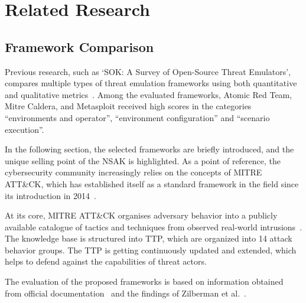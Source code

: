 
\chapter{Related Research}\label{ch:related-research}

\section{Framework Comparison}\label{sec:framework-comparison}
Previous research, such as \enquote*{SOK: A Survey of Open-Source Threat Emulators},
compares multiple types of threat emulation frameworks using both quantitative and qualitative metrics~\cite{Zilberman2020SoKThreatEmulators}.
Among the evaluated frameworks, Atomic Red Team, Mitre Caldera,
and Metasploit received high scores in the categories \enquote{environments and operator}, \enquote{environment configuration} and \enquote{scenario execution}.

In the following section, the selected frameworks are briefly introduced, and the unique selling point of the \gls{NSAK} is highlighted.
As a point of reference, the cybersecurity community increasingly relies on the concepts of MITRE ATT\&CK,
which has established itself as a standard framework in the field since its introduction in 2014~\cite{mitreattack, alsada2023attack}.

At its core, MITRE ATT\&CK organises adversary behavior into a publicly available catalogue of tactics and techniques from observed real-world intrusions~\cite{mitreattack}.
The knowledge base is structured into \gls{TTP}, which are organized into 14 attack behavior groups.
The \gls{TTP} is getting continuously updated and extended, which helps to defend against the capabilities of threat actors.

The evaluation of the proposed frameworks is based on information obtained from official documentation~\cite{caldera,atomicredteam,metasploitdocs} and the findings of Zilberman et al.~\cite{Zilberman2020SoKThreatEmulators}.

